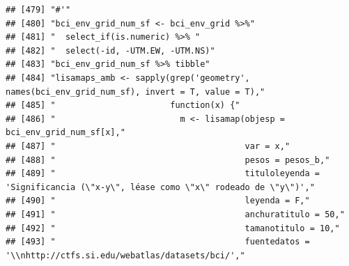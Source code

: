 \documentclass[11pt,]{article}
\begin{document}
\begin{verbatim}
## [479] "#'"                                                                                                                                                                    
## [480] "bci_env_grid_num_sf <- bci_env_grid %>%"                                                                                                                               
## [481] "  select_if(is.numeric) %>% "                                                                                                                                          
## [482] "  select(-id, -UTM.EW, -UTM.NS)"                                                                                                                                       
## [483] "bci_env_grid_num_sf %>% tibble"                                                                                                                                        
## [484] "lisamaps_amb <- sapply(grep('geometry', names(bci_env_grid_num_sf), invert = T, value = T),"                                                                           
## [485] "                       function(x) {"                                                                                                                                  
## [486] "                         m <- lisamap(objesp = bci_env_grid_num_sf[x],"                                                                                                
## [487] "                                      var = x,"                                                                                                                        
## [488] "                                      pesos = pesos_b,"                                                                                                                
## [489] "                                      tituloleyenda = 'Significancia (\"x-y\", léase como \"x\" rodeado de \"y\")',"                                                   
## [490] "                                      leyenda = F,"                                                                                                                    
## [491] "                                      anchuratitulo = 50,"                                                                                                             
## [492] "                                      tamanotitulo = 10,"                                                                                                              
## [493] "                                      fuentedatos = '\\nhttp://ctfs.si.edu/webatlas/datasets/bci/',"                                                                   

\end{verbatim}
\end{document}

